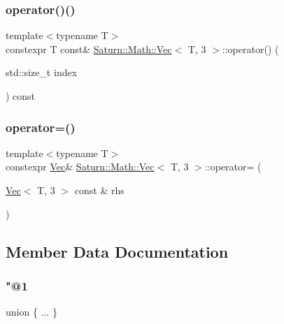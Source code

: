 \subsubsection{\texorpdfstring{operator()()}{operator()()}\hspace{0.1cm}{\footnotesize\ttfamily [2/2]}}
{\footnotesize\ttfamily template$<$typename T$>$ \\
constexpr T const\& \mbox{\hyperlink{class_saturn_1_1_math_1_1_vec}{Saturn\+::\+Math\+::\+Vec}}$<$ T, 3 $>$\+::operator() (\begin{DoxyParamCaption}\item[{std\+::size\+\_\+t}]{index }\end{DoxyParamCaption}) const\hspace{0.3cm}{\ttfamily [inline]}}

\mbox{\label{class_saturn_1_1_math_1_1_vec_3_01_t_00_013_01_4_a7be2708d9c39bb58d97e4a3e896c4740}} 
\subsubsection{\texorpdfstring{operator=()}{operator=()}}
{\footnotesize\ttfamily template$<$typename T$>$ \\
constexpr \mbox{\hyperlink{class_saturn_1_1_math_1_1_vec}{Vec}}\& \mbox{\hyperlink{class_saturn_1_1_math_1_1_vec}{Saturn\+::\+Math\+::\+Vec}}$<$ T, 3 $>$\+::operator= (\begin{DoxyParamCaption}\item[{\mbox{\hyperlink{class_saturn_1_1_math_1_1_vec}{Vec}}$<$ T, 3 $>$ const \&}]{rhs }\end{DoxyParamCaption})\hspace{0.3cm}{\ttfamily [inline]}}



\subsection{Member Data Documentation}
\mbox{\label{class_saturn_1_1_math_1_1_vec_3_01_t_00_013_01_4_a43a8487a32cd99d36953610e8554b0df}} 
\subsubsection{\texorpdfstring{"@1}{@1}}
{\footnotesize\ttfamily union \{ ... \} }

